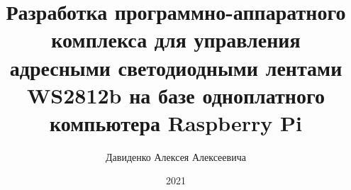 
\title{Разработка программно-аппаратного комплекса для управления адресными светодиодными лентами WS2812b на базе одноплатного компьютера Raspberry Pi}




\author{Давиденко Алексея Алексеевича}



\date{2021}

\maketitle

\secNumbering

\tableofcontents